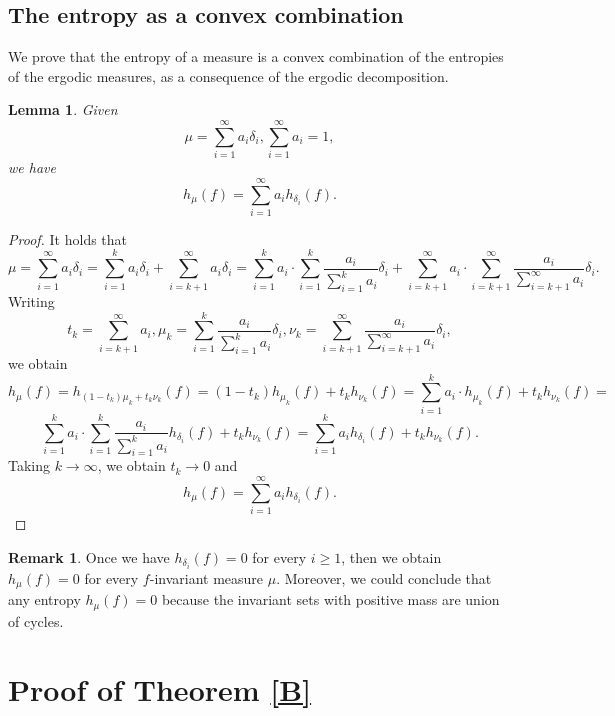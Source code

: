 \documentclass[12 pt]{amsart}
\newtheorem{lemma}[theorem]{Lemma}
\theoremstyle{definition}
\newtheorem{remark}[theorem]{Remark}
\begin{document}
	\subsection{The entropy as a convex combination}
	We prove that the entropy of a measure is a convex combination of the entropies of the ergodic measures, as a consequence of the ergodic decomposition.
	\begin{lemma}
		Given
		\[
		\mu = \sum_{i=1}^{\infty} a_{i} \delta_{i}, \sum_{i=1}^{\infty} a_{i} = 1,
		\]
		we have
		\[
		h_{\mu}(f) = \sum_{i=1}^{\infty} a_{i} h_{\delta_{i}}(f).
		\]
	\end{lemma}
	\begin{proof}
		It holds that
		\[
		\mu = \sum_{i=1}^{\infty} a_{i} \delta_{i} = \sum_{i=1}^{k} a_{i} \delta_{i} + \sum_{i=k+1}^{\infty} a_{i} \delta_{i} = \sum_{i=1}^{k}a_{i}\cdot \sum_{i=1}^{k} \frac{a_{i}}{\sum_{i=1}^{k}a_{i}} \delta_{i} + \sum_{i=k+1}^{\infty}a_{i}\cdot \sum_{i=k+1}^{\infty}  \frac{a_{i}}{\sum_{i=k+1}^{\infty}a_{i}} \delta_{i}.
		\]
		Writing 
		\[
		t_{k} = \sum_{i=k+1}^{\infty}a_{i}, \mu_{k} = \sum_{i=1}^{k} \frac{a_{i}}{\sum_{i=1}^{k}a_{i}} \delta_{i}, \nu_{k} = \sum_{i=k+1}^{\infty}  \frac{a_{i}}{\sum_{i=k+1}^{\infty}a_{i}} \delta_{i},
		\]
		we obtain
		\[
		h_{\mu}(f) = h_{(1 - t_{k})\mu_{k} + t_{k}\nu_{k}}(f) = (1 - t_{k})h_{\mu_{k}}(f) + t_{k}h_{\nu_{k}}(f) = \sum_{i=1}^{k}a_{i} \cdot h_{\mu_{k}}(f) + t_{k}h_{\nu_{k}}(f) = 
		\]
		\[
		\sum_{i=1}^{k}a_{i} \cdot \sum_{i=1}^{k}  \frac{a_{i}}{\sum_{i=1}^{k}a_{i}} h_{\delta_{i}}(f)+ t_{k}h_{\nu_{k}}(f) =  \sum_{i=1}^{k} a_{i} h_{\delta_{i}}(f)+ t_{k}h_{\nu_{k}}(f).
		\]
		Taking $k \to \infty$, we obtain $t_{k} \to 0$ and
		\[
		h_{\mu}(f) = \sum_{i=1}^{\infty} a_{i} h_{\delta_{i}}(f).
		\]	
	\end{proof}
	\begin{remark}
		Once we have $h_{\delta_{i}}(f) = 0$ for every $i \geq 1$, then we obtain $h_{\mu}(f) = 0$ for every $f$-invariant measure $\mu$. Moreover, we could conclude that any entropy $h_{\mu}(f) = 0$ because the invariant sets with positive mass are union of cycles.
	\end{remark}
	
	\section{Proof of Theorem \ref{B}}
	
\end{document}
